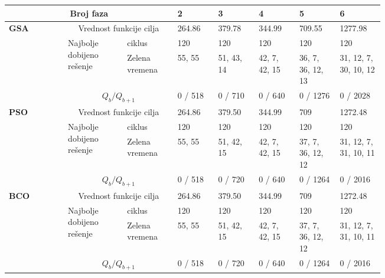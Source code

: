 \begin{table*}
    \begin{center}
      \begin{tabular}{p{0.12\linewidth}p{0.12\linewidth}p{0.1\linewidth}p{0.08\linewidth}p{0.08\linewidth}p{0.08\linewidth}p{0.08\linewidth}p{0.08\linewidth}}
        \hline 
        \multicolumn{3}{c}{Broj faza} & 2 & 3 & 4 & 5 & 6 \\ 
        \hline 
        \multirow{4}{4em}{\textbf{GSA}} & \multicolumn{2}{c}{Vrednost funkcije cilja}                    
        & 264.86 & 379.78 & 344.99 & 709.55 & 1277.98\\ 
        \cmidrule{2-8}
        & \multirow{2}{0.9\linewidth}{Najbolje dobijeno rešenje} & ciklus 
        & 120 & 120 & 120 & 120 & 120 \\ 
                               \cmidrule{3-8}
                               &  & Zelena vremena   
        &  55, 55 & 51, 43, 14 & 42, 7, 42, 15 &  36, 7, 36, 12, 13 & 31, 12, 7, 30, 10, 12 \\ 
        \cmidrule{2-8}
        & \multicolumn{2}{c}{$ Q_b / Q_{b+1}$} 
        & 0 / 518 & 0 / 710 & 0 / 640 & 0 / 1276 & 0 / 2028  \\
        
        \hline
        \multirow{4}{4em}{\textbf{PSO}} & \multicolumn{2}{c}{Vrednost funkcije cilja}                    
        & 264.86 & 379.50 & 344.99 & 709 & 1272.48  \\
        \cmidrule{2-8}
        & \multirow{2}{0.9\linewidth}{Najbolje dobijeno rešenje} & ciklus 
        & 120 & 120 & 120 & 120 & 120 \\ 
                               \cmidrule{3-8}
                               &  & Zelena vremena   
        &  55, 55 & 51, 42, 15 & 42, 7, 42, 15 & 37, 7, 36, 12, 12 & 31, 12, 7, 31, 10, 11  \\
        \cmidrule{2-8}
        & \multicolumn{2}{c}{$ Q_b / Q_{b+1}$} 
        & 0 / 518 & 0 / 720 & 0 / 640 & 0 / 1264 & 0 / 2016  \\
        \hline
        \multirow{4}{4em}{\textbf{BCO}} & \multicolumn{2}{c}{Vrednost funkcije cilja}                     
        & 264.86 & 379.50 & 344.99 & 709 & 1272.48  \\
        \cmidrule{2-8}
        & \multirow{2}{0.9\linewidth}{Najbolje dobijeno rešenje} & ciklus 
        & 120 & 120 & 120 & 120 & 120 \\ 
                               \cmidrule{3-8}
                               &  & Zelena vremena   
        &  55, 55 & 51, 42, 15 & 42, 7, 42, 15 & 37, 7, 36, 12, 12 & 31, 12, 7, 31, 10, 11  \\
        \cmidrule{2-8}
        & \multicolumn{2}{c}{$ Q_b / Q_{b+1}$} 
        & 0 / 518 & 0 / 720 & 0 / 640 & 0 / 1264 & 0 / 2016  \\
        \hline
      \end{tabular}
    \end{center}
  \end{table*}
  
